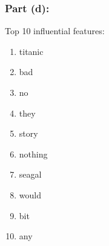 \documentclass[11pt]{article}
\begin{document}
\begin{flushleft}
\begin{figure}[H]
	\centering
\end{figure}

\subsubsection*{Part (d):}
Top 10 influential features:
\begin{enumerate}
	\item titanic
	\item bad
	\item no
	\item they
	\item story
	\item nothing
	\item seagal
	\item would
	\item bit
	\item any
\end{enumerate}



\end{flushleft}
\end{document}
